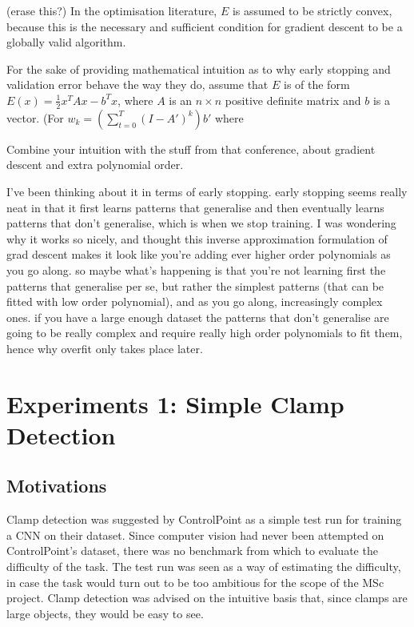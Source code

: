 \documentclass[a4paper,11pt]{article}
\begin{document}
(erase this?) In the optimisation literature, $E$ is assumed to be strictly convex, because this is the necessary and sufficient condition for gradient descent to be a globally valid algorithm. 

For the sake of providing mathematical intuition as to why early stopping and validation error behave the way they do, assume that $E$ is of the form $E(x) = \frac{1}{2}x^T Ax - b^T x$, where $A$ is an $n \times n$ positive definite matrix and $b$ is a vector. (For 
$ w_k = ( \sum_{t=0}^{T} (I - A')^k)b'$ where 


Combine your intuition with the stuff from that conference, about gradient descent and extra polynomial order.

I've been thinking about it in terms of early stopping. early stopping seems really neat in that it first learns patterns that generalise and then eventually learns patterns that don't generalise, which is when we stop training. I was wondering why  it works so nicely, and thought this inverse approximation formulation of grad descent makes it look like you're adding ever higher order polynomials as you go along. so maybe what's happening is that you're not learning first the patterns that generalise per se, but rather the simplest patterns (that can be fitted with low order polynomial), and as you go along, increasingly complex ones. if you have a large enough dataset the patterns that don't generalise are going to be really complex and require really high order polynomials to fit them, hence why overfit only takes place later.

\clearpage

\section{Experiments 1: Simple Clamp Detection}

\subsection{Motivations}

Clamp detection was suggested by ControlPoint as a simple test run for training a CNN on their dataset. Since computer vision had never been attempted on ControlPoint's dataset, there was no benchmark from which to evaluate the difficulty of the task. The test run was seen as a way of estimating the difficulty, in case the task would turn out to be too ambitious for the scope of the MSc project. Clamp detection was advised on the intuitive basis that, since clamps are large objects, they would be easy to see. 
\end{document}
